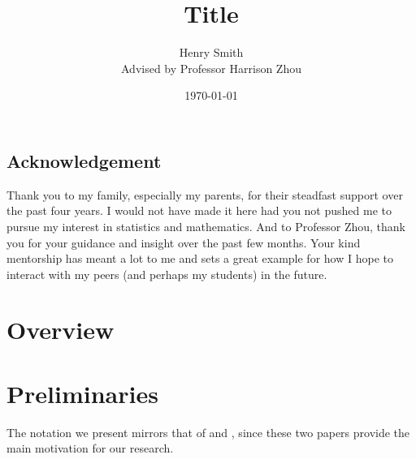 \documentclass{article}
\title{\textbf{Title}}
\author[]{Henry Smith\\
Advised by Professor Harrison Zhou}
\affil[]{\normalsize Yale University}
\date{\today}
\begin{document}
\maketitle

\begin{abstract}

\end{abstract}

\pagebreak

\vspace*{\fill}

\begin{centering}
\section*{Acknowledgement}
Thank you to my family, especially my parents, for their steadfast support over the past four years. I would not have made it here had you not pushed me to pursue my interest in statistics and mathematics. And to Professor Zhou, thank you for your guidance and insight over the past few months. Your kind mentorship has meant a lot to me and sets a great example for how I hope to interact with my peers (and perhaps my students) in the future. 
\end{centering}

\vspace*{\fill}

\pagebreak

\vspace*{\fill}

\begin{centering}
\tableofcontents
\end{centering}

\vspace*{\fill}

\pagebreak

\section{Overview}

\section{Preliminaries}\label{preliminaries}

The notation we present mirrors that of \cite{chizat2018lazy} and \cite{woodworth2020kernel}, since these two papers provide the main motivation for our research.
\end{document}
